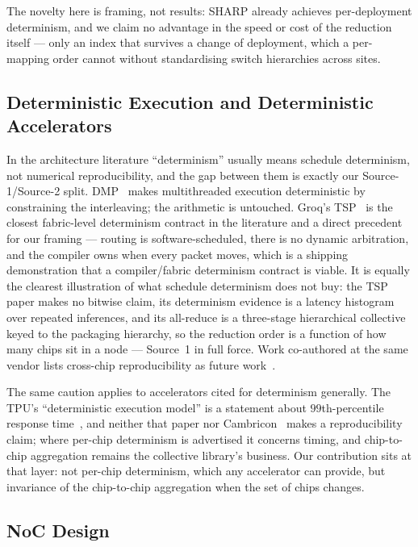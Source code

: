 \documentclass[journal,10pt]{IEEEtran}
\theoremstyle{plain}
\theoremstyle{definition}
\theoremstyle{remark}
\begin{document}
The novelty here is framing, not results: SHARP already achieves
per-deployment determinism, and we claim no advantage in the speed or cost of
the reduction itself --- only an index that survives a change of deployment,
which a per-mapping order cannot without standardising switch hierarchies
across sites.

\subsection{Deterministic Execution and Deterministic Accelerators}

In the architecture literature ``determinism'' usually means schedule
determinism, not numerical reproducibility, and the gap between them is
exactly our Source-1/Source-2 split. DMP~\cite{devietti2009dmp} makes
multithreaded execution deterministic by constraining the interleaving; the
arithmetic is untouched. Groq's TSP~\cite{abts2022groq} is the closest
fabric-level determinism contract in the literature and a direct precedent
for our framing --- routing is software-scheduled, there is no dynamic
arbitration, and the compiler owns when every packet moves, which is a
shipping demonstration that a compiler/fabric determinism contract is
viable. It is equally the clearest illustration of what schedule determinism
does not buy: the TSP paper makes no bitwise claim, its determinism evidence
is a latency histogram over repeated inferences, and its all-reduce is a
three-stage hierarchical collective keyed to the packaging hierarchy, so the
reduction order is a function of how many chips sit in a node --- Source~1
in full force. Work co-authored at the same vendor lists cross-chip
reproducibility as future work~\cite{shanmugavelu2024}.

The same caution applies to accelerators cited for determinism generally.
The TPU's ``deterministic execution model'' is a statement about
$99$th-percentile response time~\cite{jouppi2017tpu}, and neither that paper
nor Cambricon~\cite{liu2016cambricon} makes a reproducibility claim; where
per-chip determinism is advertised it concerns timing, and chip-to-chip
aggregation remains the collective library's business. Our contribution sits
at that layer: not per-chip determinism, which any accelerator can provide,
but invariance of the chip-to-chip aggregation when the set of chips
changes.

\subsection{NoC Design}
\end{document}
